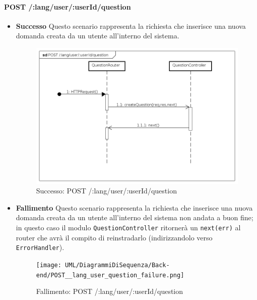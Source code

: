 \paragraph{POST /:lang/user/:userId/question}
\begin{itemize}
\item \textbf{Successo}
Questo scenario rappresenta la richiesta che inserisce una nuova domanda creata da un utente all'interno del sistema.


\begin{figure}[ht]
	\centering
	\includegraphics[scale=0.45]{UML/DiagrammiDiSequenza/Back-end/POST__lang_user_question_success.png}
	\caption{Successo: POST /:lang/user/:userId/question}
\end{figure}
\FloatBarrier

\item \textbf{Fallimento}
Questo scenario rappresenta la richiesta che inserisce una nuova domanda creata da un utente all'interno del sistema non andata a buon fine; in questo caso il modulo \texttt{QuestionController} ritornerà un \texttt{next(err)} al router che avrà il compito di reinstradarlo (indirizzandolo verso \texttt{ErrorHandler}).

\begin{figure}[ht]
	\centering
	\texttt{[image: UML/DiagrammiDiSequenza/Back-end/POST\_\_lang\_user\_question\_failure.png]}
	\caption{Fallimento: POST /:lang/user/:userId/question}
\end{figure}
\FloatBarrier

\end{itemize}

